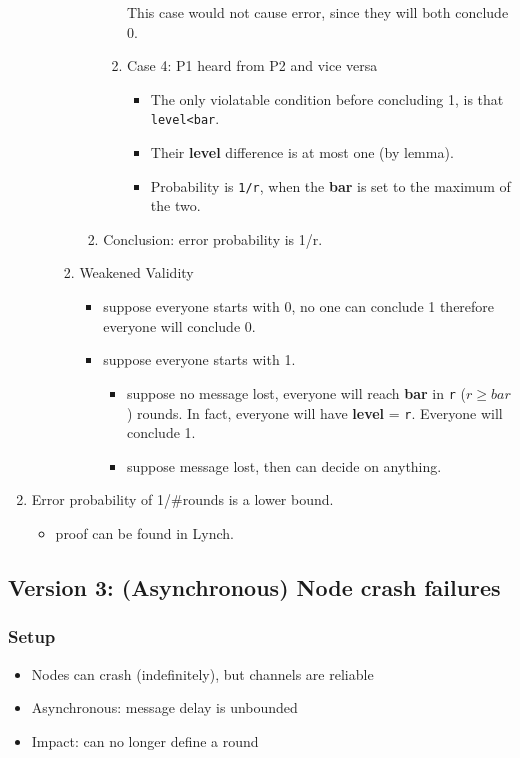 \documentclass[11pt]{article}
\begin{document}
\begin{enumerate}
\begin{enumerate}
\begin{enumerate}
\begin{enumerate}
\begin{enumerate}
\label{sec:org72be5df}
This case would not cause error, since they will both conclude 0.
\item Case 4: P1 heard from P2 and vice versa
\label{sec:orgb10742d}
\begin{itemize}
\item The only violatable condition before concluding 1, is that \texttt{level<bar}.
\item Their \textbf{level} difference is at most one (by lemma).
\item Probability is \texttt{1/r}, when the \textbf{bar} is set to the maximum of the two.
\end{itemize}
\end{enumerate}
\item Conclusion: error probability is 1/r.
\label{sec:org9ff9c39}
\end{enumerate}
\item Weakened Validity
\label{sec:org062db16}
\begin{itemize}
\item suppose everyone starts with 0, no one can conclude 1 therefore everyone will
conclude 0.
\item suppose everyone starts with 1.
\begin{itemize}
\item suppose no message lost, everyone will reach \textbf{bar} in \texttt{r} (\(r\ge bar\))
rounds. In fact, everyone will have \textbf{level} = \texttt{r}. Everyone will conclude 1.
\item suppose message lost, then can decide on anything.
\end{itemize}
\end{itemize}
\end{enumerate}
\end{enumerate}
\item Error probability of 1/\#rounds is a lower bound.
\label{sec:org7974dbb}
\begin{itemize}
\item proof can be found in Lynch.
\end{itemize}
\end{enumerate}
\subsection{Version 3: (Asynchronous) Node crash failures}
\label{sec:org49d8d12}
\subsubsection{Setup}
\label{sec:org6ac51b3}
\begin{itemize}
\item Nodes can crash (indefinitely), but channels are reliable
\item Asynchronous: message delay is unbounded
\item Impact: can no longer define a round
\end{itemize}
\end{document}
